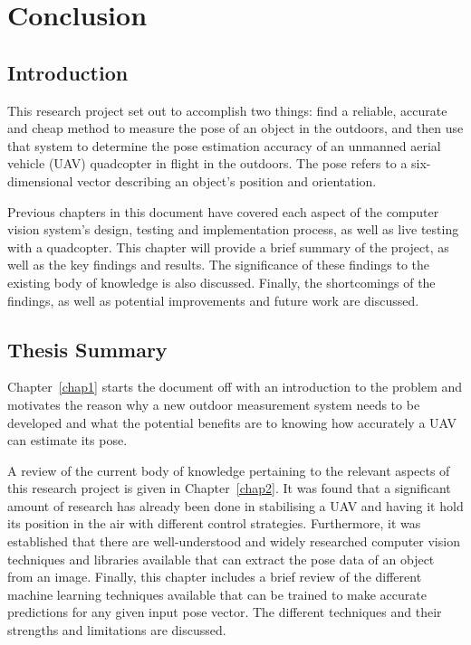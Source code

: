 \chapter{Conclusion}
\label{chap6}

\section{Introduction}

This research project set out to accomplish two things: find a reliable, accurate and cheap method to measure the pose of an object in the outdoors, and then use that system to determine the pose estimation accuracy of an unmanned aerial vehicle (UAV) quadcopter in flight in the outdoors. The pose refers to a six-dimensional vector describing an object's position and orientation. 

Previous chapters in this document have covered each aspect of the computer vision system's design, testing and implementation process, as well as live testing with a quadcopter. This chapter will provide a brief summary of the project, as well as the key findings and results. The significance of these findings to the existing body of knowledge is also discussed. Finally, the shortcomings of the findings, as well as potential improvements and future work are discussed. 

\section{Thesis Summary}

Chapter~\ref{chap1} starts the document off with an introduction to the problem and motivates the reason why a new outdoor measurement system needs to be developed and what the potential benefits are to knowing how accurately a UAV can estimate its pose.  

A review of the current body of knowledge pertaining to the relevant aspects of this research project is given in Chapter~\ref{chap2}. It was found that a significant amount of research has already been done in stabilising a UAV and having it hold its position in the air with different control strategies. Furthermore, it was established that there are well-understood and widely researched computer vision techniques and libraries available that can extract the pose data of an object from an image. Finally, this chapter includes a brief review of the different machine learning techniques available that can be trained to make accurate predictions for any given input pose vector. The different techniques and their strengths and limitations are discussed.  

